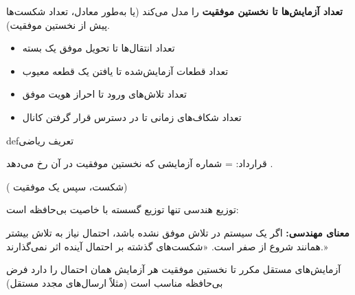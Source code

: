\textbf{تعداد آزمایش‌ها تا نخستین موفقیت} را مدل می‌کند (یا به‌طور معادل، تعداد شکست‌ها پیش از نخستین موفقیت).


\begin{itemize}
\tightlist
\item
  تعداد انتقال‌ها تا تحویل موفق یک بسته
\item
  تعداد قطعات آزمایش‌شده تا یافتن یک قطعه معیوب
\item
  تعداد تلاش‌های ورود تا احراز هویت موفق
\item
  تعداد شکاف‌های زمانی تا در دسترس قرار گرفتن کانال
\end{itemize}

\begin{PSbox}[unbreakable]{def}{تعریف ریاضی}


قرارداد:  = شماره آزمایشی که نخستین موفقیت در آن رخ می‌دهد .

\end{PSbox}



( شکست، سپس یک موفقیت)








توزیع هندسی تنها توزیع گسسته با خاصیت بی‌حافظه است:


\textbf{معنای مهندسی:} اگر یک سیستم در  تلاش موفق نشده باشد، احتمال نیاز به  تلاش بیشتر همانند شروع از صفر است. «شکست‌های گذشته بر احتمال آینده اثر نمی‌گذارند.»


\lr{\mbox{\PSyes{}}} آزمایش‌های مستقل مکرر تا نخستین موفقیت\PSbr{}\lr{\mbox{\PSyes{}}} هر آزمایش همان احتمال را دارد\PSbr{}\lr{\mbox{\PSyes{}}} فرض بی‌حافظه مناسب است (مثلاً ارسال‌های مجدد مستقل)

